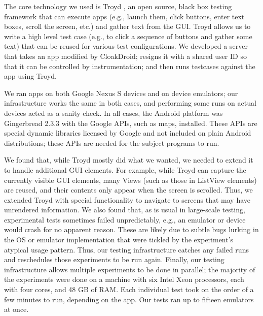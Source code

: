 \documentclass[10pt, conference, compsocconf]{IEEEtran}
\newcommand{\fuzzer}{CloakDroid\xspace}
\newcommand{\code}[1]{\textsf{\small #1}}
\begin{document}
The core technology we used is Troyd \cite{jsjeon:troyd}, an open source,
black box testing framework that can execute apps (e.g., launch them,
click buttons, enter text boxes, scroll the screen, etc.) and gather
text from the GUI. 
Troyd allows us to write a high level test case (e.g., to click a sequence of
buttons and gather some text) that can be reused for various test 
configurations.
We developed a server that takes an app modified by
\fuzzer{}; resigns it with a shared user ID so that it
can be controlled by instrumentation; and then runs testcases against
the app using Troyd.

We ran apps on both Google Nexus S devices and on
device emulators; our infrastructure works the same in both cases, and
performing some runs on actual devices acted as a sanity check. In all
cases, the Android platform was Gingerbread 2.3.3 with the Google
APIs, such as maps, installed. These APIs are special dynamic libraries licensed by Google and not included 
on plain Android distributions; these APIs are
needed for the subject programs to run.

We found that, while Troyd mostly did what we wanted, we needed to
extend it to handle additional GUI elements.
For example, while Troyd can capture the currently visible GUI elements,
many \code{Views} (such as those in \code{ListView} elements) are 
reused, and their contents only appear when the screen is scrolled.
Thus, we extended Troyd with special functionality to 
navigate to screens that may have unrendered information.
We also found that, as is usual in large-scale
testing, 
experimental tests sometimes failed unpredictably, e.g., an emulator
or device would crash for no apparent reason. These are likely due to
subtle bugs lurking in the OS or emulator implementation that
were tickled by the experiment's atypical usage pattern. Thus, our
testing infrastructure catches any failed runs and reschedules those
experiments to be run again. Finally, our testing infrastructure allows
multiple experiments to be done in parallel; the majority of the
experiments were done on a machine with six Intel Xeon processors, 
each with four cores, and 48 GB of RAM.  Each individual test took on
the order of a few minutes to run, depending on the app.
Our tests ran up to fifteen emulators at once.

\end{document}
